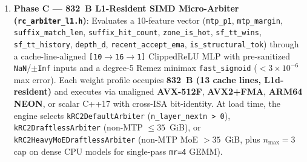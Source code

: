 \documentclass[10pt,twocolumn]{article}
\begin{document}
\begin{enumerate}
    \item \textbf{Phase C --- 832~B L1-Resident SIMD Micro-Arbiter (\texttt{rc\_arbiter\_l1.h})}: Evaluates a 10-feature vector (\texttt{mtp\_p1}, \texttt{mtp\_margin}, \texttt{suffix\_match\_len}, \texttt{suffix\_hit\_count}, \texttt{zone\_is\_hot}, \texttt{sf\_tt\_wins}, \texttt{sf\_tt\_history}, \texttt{depth\_d}, \texttt{recent\_accept\_ema}, \texttt{is\_structural\_tok}) through a cache-line-aligned \texttt{[10$\to$16$\to$1]} ClippedReLU MLP with pre-sanitized \texttt{NaN}/\texttt{$\pm$Inf} inputs and a degree-5 Remez minimax \texttt{fast\_sigmoid} ($<3\times 10^{-6}$ max error). Each weight profile occupies \textbf{832~B (13 cache lines, L1d-resident)} and executes via unaligned \textbf{AVX-512F}, \textbf{AVX2+FMA}, \textbf{ARM64 NEON}, or scalar C++17 with cross-ISA bit-identity. At load time, the engine selects \texttt{kRC2DefaultArbiter} (\texttt{n\_layer\_nextn > 0}), \texttt{kRC2DraftlessArbiter} (non-MTP $\le 35$~GiB), or \texttt{kRC2HeavyMoEDraftlessArbiter} (non-MTP MoE $>35$~GiB, plus $n_{\max}=3$ cap on dense CPU models for single-pass \texttt{mr=4} GEMM).
\end{enumerate}
\end{document}
